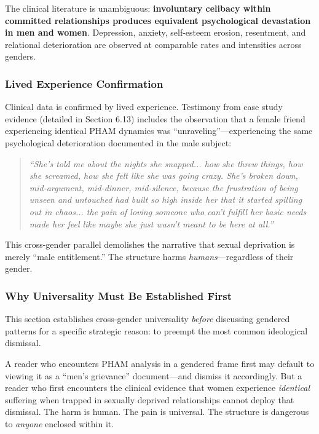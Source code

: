 \documentclass[12pt, letterpaper]{article}
\begin{document}
The clinical literature is unambiguous: \textbf{involuntary celibacy within committed relationships produces equivalent psychological devastation in men and women}. Depression, anxiety, self-esteem erosion, resentment, and relational deterioration are observed at comparable rates and intensities across genders.

\subsubsection{Lived Experience Confirmation}

Clinical data is confirmed by lived experience. Testimony from case study evidence (detailed in Section 6.13) includes the observation that a female friend experiencing identical PHAM dynamics was ``unraveling''---experiencing the same psychological deterioration documented in the male subject:

\begin{quote}
\textit{``She's told me about the nights she snapped... how she threw things, how she screamed, how she felt like she was going crazy. She's broken down, mid-argument, mid-dinner, mid-silence, because the frustration of being unseen and untouched had built so high inside her that it started spilling out in chaos... the pain of loving someone who can't fulfill her basic needs made her feel like maybe she just wasn't meant to be here at all.''}
\end{quote}

This cross-gender parallel demolishes the narrative that sexual deprivation is merely ``male entitlement.'' The structure harms \textit{humans}---regardless of their gender.

\subsubsection{Why Universality Must Be Established First}

This section establishes cross-gender universality \textit{before} discussing gendered patterns for a specific strategic reason: to preempt the most common ideological dismissal.

A reader who encounters PHAM analysis in a gendered frame first may default to viewing it as a ``men's grievance'' document---and dismiss it accordingly. But a reader who first encounters the clinical evidence that women experience \textit{identical} suffering when trapped in sexually deprived relationships cannot deploy that dismissal. The harm is human. The pain is universal. The structure is dangerous to \textit{anyone} enclosed within it.
\end{document}
